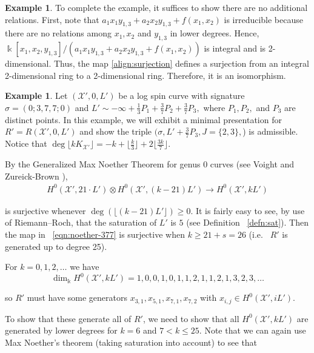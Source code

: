 \documentclass{amsart}
\theoremstyle{plain}
\theoremstyle{definition}
\newtheorem{example}[thm]{Example}
\theoremstyle{remark}
\numberwithin{equation}{section}
\newcommand\Bk{{\Bbbk}}
\newcommand\sx{\mathscr X}
\newcommand{\halfcan}{L}
\begin{document}
\begin{example}
To complete the example, it suffices to show there are no
additional relations. First, note that $a_1 x_1 y_{1, 3} + a_2 x_2
y_{1, 3} + f(x_1, x_2)$ is irreducible because there are no
relations among $x_1, x_2$ and $y_{1, 3}$ in lower degrees. Hence,
$\Bk[x_1, x_2, y_{1, 3}] / (a_1 x_1 y_{1, 3} + a_2 x_2 y_{1, 3} +
f(x_1, x_2))$ is integral and is 2-dimensional. Thus, the map
\eqref{align:surjection} defines a surjection from an integral
2-dimensional ring to a 2-dimensional ring. Therefore, it is an 
isomorphism.
\end{example}

\begin{example}
\label{eg:base-0-377}
Let $(\sx', 0, \halfcan')$ be a log spin curve with signature $\sigma =
(0; 3, 7, 7; 0)$ and $\halfcan' \sim -\infty + \frac{1}{3} P_1 +
\frac{3}{7} P_2 + \frac{3}{7} P_3,$ where $P_1, P_2,$ and $P_3$ are
distinct points. In this example, we will exhibit a minimal
presentation for $R' = R(\sx', 0, \halfcan')$ and show the triple
$(\sigma, \halfcan' + \frac{3}{7} P_3, J = \{2, 3\},$) is admissible.
Notice that $\deg \lfloor k K_{\sx'} \rfloor= -k + \lfloor \frac{k}{3}
\rfloor + 2 \lfloor \frac{3k}{7} \rfloor$.

By the Generalized Max Noether Theorem for genus 0 curves (see Voight
and Zureick-Brown \cite[Lemma 3.1.1]{vzb:stacky}),
\begin{align}
\label{eqn:noether-377}
	H^0 (\sx', 21 \cdot \halfcan') \otimes H^0 (\sx',
	(k - 21) \halfcan') \rightarrow H^0 (\sx',
	k \halfcan')
\end{align}

\noindent
is surjective whenever $\deg (\lfloor (k - 21) \halfcan' \rfloor)
\geq 0$. It is fairly easy to see, by use of Riemann--Roch, that
the saturation of $\halfcan'$ is $5$ (see Definition ~\ref{defn:sat}).
Then the map in ~\eqref{eqn:noether-377} is surjective when $k \geq
21 + s = 26$ (i.e.~ $R'$ is generated up to degree 25).

For $k = 0, 1, 2, \ldots$ we have
\[
	\dim_\Bk H^0 (\sx', k \halfcan') = 1, 0, 0, 1, 0, 1, 1, 2, 1, 1, 2, 1, 3, 2, 3, \ldots
\]

\noindent
so $R'$ must have some generators $x_{3, 1}, x_{5, 1}, x_{7, 1},
x_{7, 2}$ with $x_{i, j} \in H^0(\sx', i \halfcan')$.

To show that these generate all of $R'$, we need to show that all
$H^0 (\sx', k \halfcan')$ are generated by lower degrees for $k = 6$
and $7 < k \leq 25$. Note that we can again use Max Noether's theorem
(taking saturation into account) to see that


\end{example}
\end{document}
